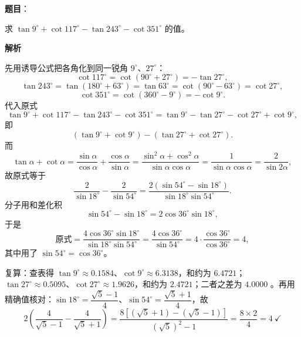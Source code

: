 \begin{answer}

\textbf{题目}：

求 $\tan 9^\circ+\cot 117^\circ-\tan 243^\circ-\cot 351^\circ$ 的值。

\textbf{解析}

先用诱导公式把各角化到同一锐角 $9^\circ$、$27^\circ$：
\nopagebreak[4]
\[
\cot117^\circ=\cot(90^\circ+27^\circ)=-\tan27^\circ,
\]
\nopagebreak[4]
\[
\tan243^\circ=\tan(180^\circ+63^\circ)=\tan63^\circ=\cot(90^\circ-63^\circ)=\cot27^\circ,
\]
\nopagebreak[4]
\[
\cot351^\circ=\cot(360^\circ-9^\circ)=-\cot9^\circ.
\]
代入原式
\nopagebreak[4]
\[
\tan9^\circ+\cot117^\circ-\tan243^\circ-\cot351^\circ
=\tan9^\circ-\tan27^\circ-\cot27^\circ+\cot9^\circ,
\]
即
\nopagebreak[4]
\[
(\tan9^\circ+\cot9^\circ)-(\tan27^\circ+\cot27^\circ).
\]
而
\nopagebreak[4]
\[
\tan\alpha+\cot\alpha=\frac{\sin\alpha}{\cos\alpha}+\frac{\cos\alpha}{\sin\alpha}=\frac{\sin^2\alpha+\cos^2\alpha}{\sin\alpha\cos\alpha}=\frac{1}{\sin\alpha\cos\alpha}=\frac{2}{\sin2\alpha},
\]
故原式等于
\nopagebreak[4]
\[
\frac{2}{\sin18^\circ}-\frac{2}{\sin54^\circ}
=\frac{2(\sin54^\circ-\sin18^\circ)}{\sin18^\circ\sin54^\circ}.
\]
分子用和差化积
\nopagebreak[4]
\[
\sin54^\circ-\sin18^\circ=2\cos36^\circ\sin18^\circ,
\]
于是
\nopagebreak[4]
\[
\text{原式}=\frac{4\cos36^\circ\sin18^\circ}{\sin18^\circ\sin54^\circ}
=\frac{4\cos36^\circ}{\sin54^\circ}=4\cdot\frac{\cos36^\circ}{\cos36^\circ}=4,
\]
其中用了 $\sin54^\circ=\cos36^\circ$。

复算：查表得 $\tan9^\circ\approx0.1584$、$\cot9^\circ\approx6.3138$，和约为 $6.4721$；$\tan27^\circ\approx0.5095$、$\cot27^\circ\approx1.9626$，和约为 $2.4721$；二者之差为 $4.0000$ 。再用精确值核对：$\sin18^\circ=\dfrac{\sqrt5-1}{4}$、$\sin54^\circ=\dfrac{\sqrt5+1}{4}$，故
\nopagebreak[4]
\[
2\left(\frac{4}{\sqrt5-1}-\frac{4}{\sqrt5+1}\right)=\frac{8\left[(\sqrt5+1)-(\sqrt5-1)\right]}{(\sqrt5)^2-1}=\frac{8\times2}{4}=4\ \checkmark
\]


\end{answer}
